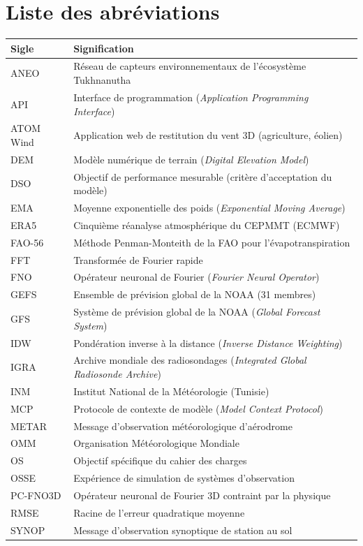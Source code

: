 \chapter*{Liste des abréviations}
\begin{longtable}{@{}p{3cm}p{11.5cm}@{}}
\toprule
\textbf{Sigle} & \textbf{Signification}\\
\midrule
\endhead
ANEO & Réseau de capteurs environnementaux de l'écosystème Tukhnanutha\\
API & Interface de programmation (\emph{Application Programming Interface})\\
ATOM Wind & Application web de restitution du vent 3D (agriculture, éolien)\\
DEM & Modèle numérique de terrain (\emph{Digital Elevation Model})\\
DSO & Objectif de performance mesurable (critère d'acceptation du modèle)\\
EMA & Moyenne exponentielle des poids (\emph{Exponential Moving Average})\\
ERA5 & Cinquième réanalyse atmosphérique du CEPMMT (ECMWF)\\
FAO-56 & Méthode Penman-Monteith de la FAO pour l'évapotranspiration\\
FFT & Transformée de Fourier rapide\\
FNO & Opérateur neuronal de Fourier (\emph{Fourier Neural Operator})\\
GEFS & Ensemble de prévision global de la NOAA (31 membres)\\
GFS & Système de prévision global de la NOAA (\emph{Global Forecast System})\\
IDW & Pondération inverse à la distance (\emph{Inverse Distance Weighting})\\
IGRA & Archive mondiale des radiosondages (\emph{Integrated Global Radiosonde Archive})\\
INM & Institut National de la Météorologie (Tunisie)\\
MCP & Protocole de contexte de modèle (\emph{Model Context Protocol})\\
METAR & Message d'observation météorologique d'aérodrome\\
OMM & Organisation Météorologique Mondiale\\
OS & Objectif spécifique du cahier des charges\\
OSSE & Expérience de simulation de systèmes d'observation\\
PC-FNO3D & Opérateur neuronal de Fourier 3D contraint par la physique\\
RMSE & Racine de l'erreur quadratique moyenne\\
SYNOP & Message d'observation synoptique de station au sol\\
\bottomrule
\end{longtable}
